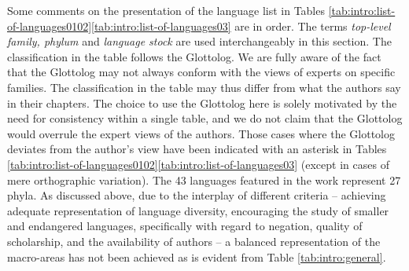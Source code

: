 \documentclass[output=paper,colorlinks,citecolor=brown]{langscibook}
\begin{document}
Some comments on the presentation of the language list in Tables \ref{tab:intro:list-of-languages0102}\textemdash\ref{tab:intro:list-of-languages03} are in order. The terms \textit{top-level family, phylum} and \textit{language stock} are used interchangeably in this section. The classification in the table follows the Glottolog. We are fully aware of the fact that the Glottolog may not always conform with the views of experts on specific families. The classification in the table may thus differ from what the authors say in their chapters. The choice to use the Glottolog here is solely motivated by the need for consistency within a single table, and we do not claim that the Glottolog would overrule the expert views of the authors. Those cases where the Glottolog deviates from the author's view have been indicated with an asterisk in Tables \ref{tab:intro:list-of-languages0102}\textemdash\ref{tab:intro:list-of-languages03} (except in cases of mere orthographic variation). The 43 languages featured in the work represent 27 phyla. As discussed above, due to the interplay of different criteria -- achieving adequate representation of language diversity, encouraging the study of smaller and endangered languages, specifically with regard to negation, quality of scholarship, and the availability of authors -- a balanced representation of the macro-areas has not been achieved as is evident from Table \ref{tab:intro:general}. 




\end{document}
